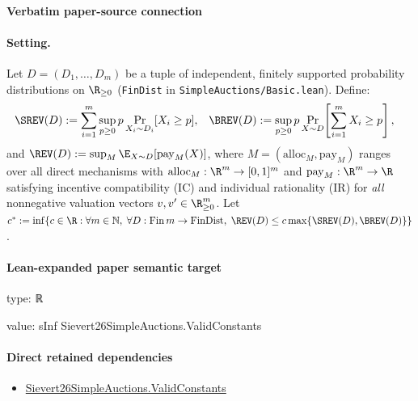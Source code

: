 \documentclass[10pt]{article}
\begin{document}
\paragraph{Verbatim paper-source connection}
\begin{ReviewVerbatim}
\paragraph{Setting.}
Let $D = (D_1, \dots, D_m)$ be a tuple of independent, finitely supported probability distributions on $\R_{\ge 0}$ (\texttt{FinDist} in \texttt{SimpleAuctions/Basic.lean}). Define:
\begin{align*}
  \SREV(D) &:= \sum_{i=1}^m \sup_{p \ge 0} p \Pr_{X_i \sim D_i}[X_i \ge p], &
  \BREV(D) &:= \sup_{p \ge 0} p \Pr_{X \sim D}\!\left[\sum_{i=1}^m X_i \ge p\right],
\end{align*}
and $\REV(D) := \sup_{M} \E_{X \sim D}[\mathrm{pay}_M(X)]$, where $M = (\mathrm{alloc}_M, \mathrm{pay}_M)$ ranges over all direct mechanisms with $\mathrm{alloc}_M : \R^m \to [0,1]^m$ and $\mathrm{pay}_M : \R^m \to \R$ satisfying incentive compatibility (IC) and individual rationality (IR) for \emph{all} nonnegative valuation vectors $v, v' \in \R_{\ge 0}^m$. Let $c^* := \inf\{c \in \R : \forall m \in \mathbb{N},\; \forall D : \mathrm{Fin}\,m \to \mathrm{FinDist},\; \REV(D) \le c \max\{\SREV(D),\BREV(D)\}\}$.
\end{ReviewVerbatim}



\paragraph{Lean-expanded paper semantic target}
\begin{ReviewVerbatim}
type:
ℝ

value:
sInf Sievert26SimpleAuctions.ValidConstants
\end{ReviewVerbatim}

\paragraph{Direct retained dependencies}
\begin{itemize}\raggedright
\item \hyperlink{governing-declaration-1ea0fec2fbf47f09}{Sievert26\allowbreak{}Simple\allowbreak{}Auctions.\allowbreak{}Valid\allowbreak{}Constants}
\end{itemize}
\end{document}
